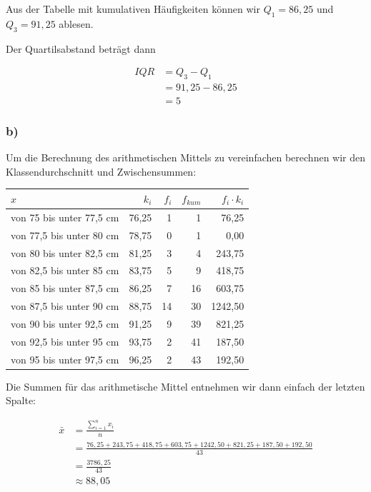 \documentclass[
  11pt,
  ngerman,
  a4paper,
]{report}
\begin{document}
Aus der Tabelle mit kumulativen Häufigkeiten können wir \(Q_1=86{,}25\) und \(Q_3=91{,}25\) ablesen.

Der Quartilsabstand beträgt dann

\[\begin{aligned}
\mathit{IQR}&=Q_3-Q_1\\
            &=91{,}25-86{,}25\\
            &=5
\end{aligned}\]

\hypertarget{b-5}{%
\subsubsection{b)}\label{b-5}}

Um die Berechnung des arithmetischen Mittels zu vereinfachen berechnen wir den Klassendurchschnitt und Zwischensummen:

\begin{table}[H]
\centering
\begin{tabular}{lrrrr}
\toprule
$x$ & $k_i$ & $f_i$ & $f_{kum}$ & $f_i \cdot k_i$\\
\midrule
von 75 bis unter 77,5 cm & 76,25 & 1 & 1 & 76,25\\
von 77,5 bis unter 80 cm & 78,75 & 0 & 1 & 0,00\\
von 80 bis unter 82,5 cm & 81,25 & 3 & 4 & 243,75\\
von 82,5 bis unter 85 cm & 83,75 & 5 & 9 & 418,75\\
von 85 bis unter 87,5 cm & 86,25 & 7 & 16 & 603,75\\
von 87,5 bis unter 90 cm & 88,75 & 14 & 30 & 1242,50\\
von 90 bis unter 92,5 cm & 91,25 & 9 & 39 & 821,25\\
von 92,5 bis unter 95 cm & 93,75 & 2 & 41 & 187,50\\
von 95 bis unter 97,5 cm & 96,25 & 2 & 43 & 192,50\\
\bottomrule
\end{tabular}
\end{table}

Die Summen für das arithmetische Mittel entnehmen wir dann einfach der letzten Spalte:

\[\begin{aligned}
  \bar{x}&=\frac{\sum\limits_{i=1}^nx_i}{n} \\
         &=\frac{76{,}25+ 243{,}75+ 418{,}75+ 603{,}75+1242{,}50+ 821{,}25+ 187{,}50+ 192{,}50}{43} \\
         &=\frac{3786{,}25}{43} \\
         &\approx88{,}05
\end{aligned}\]
\end{document}
